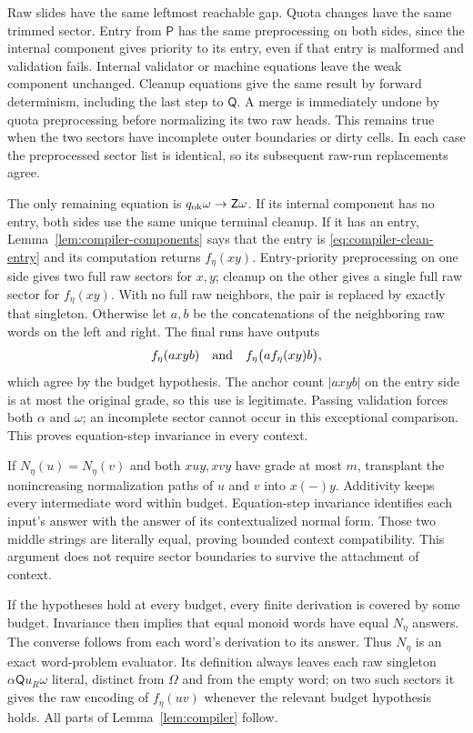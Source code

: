 Raw slides have the same leftmost reachable gap. Quota changes have the
same trimmed sector. Entry from $\mathsf P$ has the same preprocessing
on both sides, since the internal component gives priority to its entry,
even if that entry is malformed and validation fails. Internal
validator or machine equations leave the weak component unchanged.
Cleanup equations give the same result by forward determinism, including
the last step to $\mathsf Q$. A merge is immediately undone by quota
preprocessing before normalizing its two raw heads. This remains true
when the two sectors have incomplete outer boundaries or dirty cells.
In each case the preprocessed sector list is identical, so its subsequent
raw-run replacements agree.

The only remaining equation is
$q_{\rm ok}\omega\to\mathsf Z\omega$. If its internal component has
no entry, both sides use the same unique terminal cleanup. If it has an
entry, Lemma~\ref{lem:compiler-components} says that the entry is
\eqref{eq:compiler-clean-entry} and its computation returns
$f_\eta(xy)$. Entry-priority preprocessing on one side gives two full
raw sectors for $x,y$; cleanup on the other gives a single full raw
sector for $f_\eta(xy)$. With no full raw neighbors, the pair is replaced
by exactly that singleton. Otherwise let $a,b$ be the concatenations of
the neighboring raw words on the left and right. The final runs have
outputs
\[
f_\eta(axyb)
\quad\hbox{and}\quad
f_\eta\bigl(a f_\eta(xy)b\bigr),
\]
which agree by the budget hypothesis. The anchor count $|axyb|$ on the
entry side is at most the original grade, so this use is legitimate.
Passing validation forces both $\alpha$ and $\omega$; an incomplete
sector cannot occur in this exceptional comparison. This proves
equation-step invariance in every context.

If $N_\eta(u)=N_\eta(v)$ and both $xuy,xvy$ have grade at most $m$,
transplant the nonincreasing normalization paths of $u$ and $v$ into
$x(-)y$. Additivity keeps every intermediate word within budget.
Equation-step invariance identifies each input's answer with the answer
of its contextualized normal form. Those two middle strings are
literally equal, proving bounded context compatibility. This argument
does not require sector boundaries to survive the attachment of context.

If the hypotheses hold at every budget, every finite derivation is
covered by some budget. Invariance then implies that equal monoid words
have equal $N_\eta$ answers. The converse follows from each word's
derivation to its answer. Thus $N_\eta$ is an exact word-problem
evaluator. Its definition always leaves each raw singleton
$\alpha\mathsf Q u_R\omega$ literal, distinct from $\Omega$ and from
the empty word; on two such sectors it gives the raw encoding of
$f_\eta(uv)$ whenever the relevant budget hypothesis holds. All parts
of Lemma~\ref{lem:compiler} follow.

